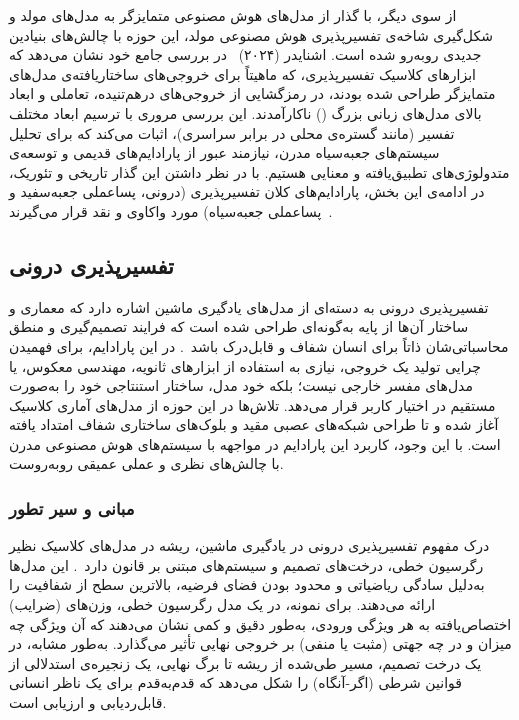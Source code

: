 از سوی دیگر، با گذار از مدل‌های هوش مصنوعی متمایزگر به مدل‌های مولد و شکل‌گیری شاخه‌ی تفسیرپذیری هوش مصنوعی مولد، این حوزه با چالش‌های بنیادین جدیدی روبه‌رو شده است. اشنایدر (۲۰۲۴)~\cite{schneider2024explainable} در بررسی جامع خود نشان می‌دهد که ابزارهای کلاسیک تفسیرپذیری، که ماهیتاً برای خروجی‌های ساختاریافته‌ی مدل‌های متمایزگر طراحی شده بودند، در رمزگشایی از خروجی‌های درهم‌تنیده، تعاملی و ابعاد بالای مدل‌های زبانی بزرگ () ناکارآمدند. این بررسی مروری با ترسیم ابعاد مختلف تفسیر (مانند گستره‌ی محلی در برابر سراسری)، اثبات می‌کند که برای تحلیل سیستم‌های جعبه‌سیاه مدرن، نیازمند عبور از پارادایم‌های قدیمی و توسعه‌ی متدولوژی‌های تطبیق‌یافته و معنایی هستیم. با در نظر داشتن این گذار تاریخی و تئوریک، در ادامه‌ی این بخش، پارادایم‌های کلان تفسیرپذیری (درونی، پساعملی جعبه‌سفید و پساعملی جعبه‌سیاه) مورد واکاوی و نقد قرار می‌گیرند~\cite{guidotti2018survey, danilevsky2020survey}. 


\subsection{تفسیرپذیری درونی}\label{sec:3-1-1}

تفسیرپذیری درونی به دسته‌ای از مدل‌های یادگیری ماشین اشاره دارد که معماری و ساختار آن‌ها از پایه به‌گونه‌ای طراحی شده است که فرایند تصمیم‌گیری و منطق محاسباتی‌شان ذاتاً برای انسان شفاف و قابل‌درک باشد~\cite{guidotti2018survey}. در این پارادایم، برای فهمیدن چرایی تولید یک خروجی، نیازی به استفاده از ابزارهای ثانویه، مهندسی معکوس، یا مدل‌های مفسر خارجی نیست؛ بلکه خود مدل، ساختار استنتاجی خود را به‌صورت مستقیم در اختیار کاربر قرار می‌دهد. تلاش‌ها در این حوزه از مدل‌های آماری کلاسیک آغاز شده و تا طراحی شبکه‌های عصبی مقید و بلوک‌های ساختاری شفاف امتداد یافته است. با این وجود، کاربرد این پارادایم در مواجهه با سیستم‌های هوش مصنوعی مدرن با چالش‌های نظری و عملی عمیقی روبه‌روست.


\subsubsection{مبانی و سیر تطور}\label{sec:3-1-1-1}

درک مفهوم تفسیرپذیری درونی در یادگیری ماشین، ریشه در مدل‌های کلاسیک نظیر رگرسیون خطی، درخت‌های تصمیم و سیستم‌های مبتنی بر قانون دارد~\cite{molnar2022interpretable}. این مدل‌ها به‌دلیل سادگی ریاضیاتی و محدود بودن فضای فرضیه، بالاترین سطح از شفافیت را ارائه می‌دهند. برای نمونه، در یک مدل رگرسیون خطی، وزن‌های (ضرایب) اختصاص‌یافته به هر ویژگی ورودی، به‌طور دقیق و کمی نشان می‌دهند که آن ویژگی چه میزان و در چه جهتی (مثبت یا منفی) بر خروجی نهایی تأثیر می‌گذارد. به‌طور مشابه، در یک درخت تصمیم، مسیر طی‌شده از ریشه تا برگ نهایی، یک زنجیره‌ی استدلالی از قوانین شرطی (اگر-آنگاه) را شکل می‌دهد که قدم‌به‌قدم برای یک ناظر انسانی قابل‌ردیابی و ارزیابی است.

